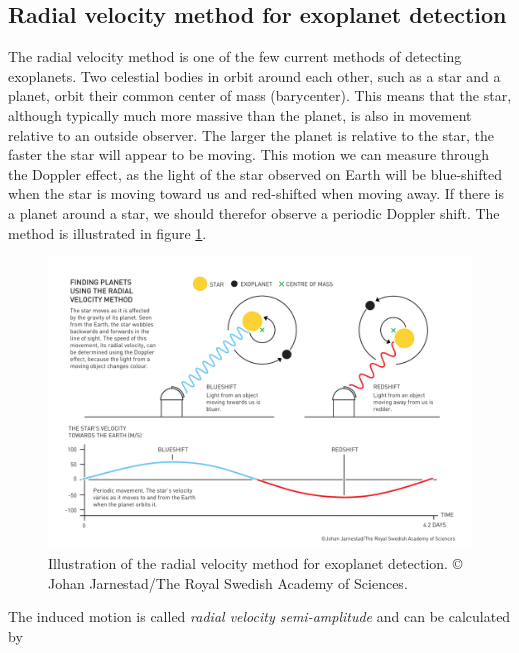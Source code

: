 \subsection{Radial velocity method for exoplanet detection}
The radial velocity method is one of the few current methods of detecting exoplanets. Two celestial bodies in orbit around each other, such as a star and a planet, orbit their common center of mass (barycenter). This means that the star, although typically much more massive than the planet, is also in movement relative to an outside observer. The larger the planet is relative to the star, the faster the star will appear to be moving. This motion we can measure through the Doppler effect, as the light of the star observed on Earth will be blue-shifted when the star is moving toward us and red-shifted when moving away. If there is a planet around a star, we should therefor observe a periodic Doppler shift. The method is illustrated in figure \ref{fig:rv_method_illustration}.

\begin{figure}%
    \begin{wide}  
        \includegraphics[width=\textwidth]{figures/rv_method_illustration.pdf}
        \caption{Illustration of the radial velocity method for exoplanet detection. © Johan Jarnestad/The Royal Swedish Academy of Sciences.}
        \label{fig:rv_method_illustration}
    \end{wide}
\end{figure}

\vspace{0.5cm}

The induced motion is called \emph{radial velocity semi-amplitude} and can be calculated by 

